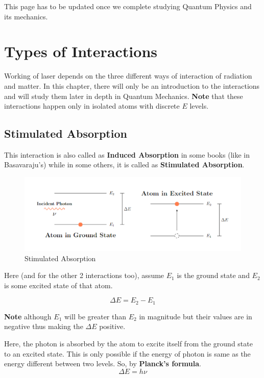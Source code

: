 \documentclass[12pt]{article}
\begin{document}
This page has to be updated once we complete studying Quantum Physics and its mechanics.

\section{Types of Interactions}

Working of laser depends on the three different ways of interaction of radiation and matter. In this chapter, there will only be an introduction to the interactions and will study them later in depth in Quantum Mechanics. \textbf{Note} that these interactions happen only in isolated atoms with discrete $E$ levels.

\subsection{Stimulated Absorption}

This interaction is also called as \textbf{Induced Absorption} in some books (like in Basavaraju's) while in some others, it is called as \textbf{Stimulated Absorption}.

\begin{figure}[H]
    \centering
    \includegraphics[scale=0.8]{./img/03_induced_absorption.png}
    \caption{Stimulated Absorption}
\end{figure}

Here (and for the other 2 interactions too), assume $E_{1}$ is the ground state and $E_{2}$ is some excited state of that atom.

\begin{equation}
    \Delta E = E_{2} - E_{1}
\end{equation}

\textbf{Note} although $E_{1}$ will be greater than $E_{2}$ in magnitude but their values are in negative thus making the $\Delta E$ positive. \vspace{.2cm}

Here, the photon is absorbed by the atom to excite itself from the ground state to an excited state. This is only possible if the energy of photon is same as the energy different between two levels. So, by \textbf{Planck's formula}.
\begin{equation}
    \Delta E = h\nu
\end{equation}
\end{document}
